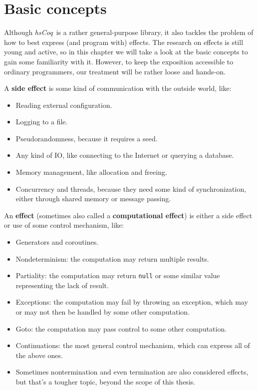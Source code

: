 \documentclass[declaration,inz,english,shortabstract]{iithesis}
\newcommand{\libname}{\textit{hsCoq}}
\newcommand{\m}[1]{\texttt{#1}}
\begin{document}
\section{Basic concepts}

Although \libname\ is a rather general-purpose library, it also tackles the problem of how to best express (and program with) effects. The research on effects is still young and active, so in this chapter we will take a look at the basic concepts to gain some familiarity with it. However, to keep the exposition accessible to ordinary programmers, our treatment will be rather loose and hands-on.

A \textbf{side effect} is some kind of communication with the outside world, like:

\begin{itemize}
    \item Reading external configuration.
    \item Logging to a file.
    \item Pseudorandomness, because it requires a seed.
    \item Any kind of IO, like connecting to the Internet or querying a database.
    \item Memory management, like allocation and freeing.
    \item Concurrency and threads, because they need some kind of synchronization, either through shared memory or message passing.
\end{itemize}

An \textbf{effect} (sometimes also called a \textbf{computational effect}) is either a side effect or use of some control mechanism, like:

\begin{itemize}
    \item Generators and coroutines.
    \item Nondeterminism: the computation may return multiple results.
    \item Partiality: the computation may return \m{null} or some similar value representing the lack of result.
    \item Exceptions: the computation may fail by throwing an exception, which may or may not then be handled by some other computation.
    \item Goto: the computation may pass control to some other computation.
    \item Continuations: the most general control mechanism, which can express all of the above ones.
    \item Sometimes nontermination and even termination are also considered effects, but that's a tougher topic, beyond the scope of this thesis.
\end{itemize}
\end{document}
